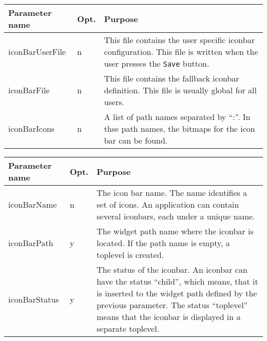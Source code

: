 {\newpage
\clearpage
\samepage \begin{figure}[ht]
  \centerline{
  \epsfysize=7cm
  }
  
  \label{fig:FontBox}
\end{figure}
}

{\newpage
\clearpage
\samepage \begin{tabular}{|l|l|p{6.5cm}|} \hline
Parameter name  & Opt. & Purpose\\  \hline
iconBarUserFile & n    & This file contains the user
                         specific iconbar configuration.
                         This file is written when the user
                         presses the {\tt Save\tt} button.\\  \hline
iconBarFile     & n    & This file contains the
                         fallback iconbar definition. This
                         file is usually global for all
                         users.\\  \hline
iconBarIcons    & n    & A list of path names separated by
                         ``:''. In thse path names, the 
                         bitmaps for the icon bar can be
                         found.\\  \hline
\end{tabular}
}

{\newpage
\clearpage
\samepage \begin{tabular}{|l|l|p{6.5cm}|} \hline
Parameter name  & Opt. & Purpose\\  \hline
iconBarName     & n    & The icon bar name. The name
                         identifies a set of icons. An
                         application can contain several
                         iconbars, each under a unique
                         name.\\  \hline
iconBarPath     & y    & The widget path name where the
                         iconbar is located. If the path
                         name is empty, a toplevel is
                         created.\\  \hline
iconBarStatus   & y    & The status of the iconbar. An
                         iconbar can have the status
                         ``child'', which means, that it is
                         inserted to the widget path defined
                         by the previous parameter. The
                         status ``toplevel'' means that the
                         iconbar is displayed in a separate
                         toplevel.\\  \hline
\end{tabular}
}

